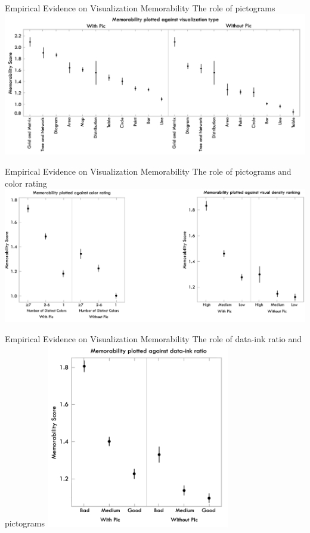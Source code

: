\documentclass[notes, aspectratio=1610]{beamer}
\begin{document}
\begin{frame}{Empirical Evidence on Visualization Memorability}
	{The role of pictograms}
	\includegraphics[width=1\textwidth]{images/1_4}
\end{frame}

\begin{frame}{Empirical Evidence on Visualization Memorability}
	{The role of pictograms and color rating}
	\includegraphics[width=1\textwidth]{images/2_4}
\end{frame}

\begin{frame}{Empirical Evidence on Visualization Memorability}
	{The role of data-ink ratio and pictograms}
	\centering
	\includegraphics[width=0.6\textwidth]{images/3_4}
\end{frame}
\end{document}
